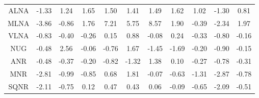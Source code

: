\documentclass[11pt,a4paper]{report}
\begin{document}
\begin{centering}
\begin{adjustwidth}{-2in}{-1in}
\begin{longtable}{ | c || c | c | c | c | c | c | c | c | c || c |}
ALNA &  \cellcolor[HTML]{FFDFDF} -1.33 &  \cellcolor[HTML]{DFDFFF} 1.24 &  \cellcolor[HTML]{D7D7FF} 1.65 &  \cellcolor[HTML]{D7D7FF} 1.50 &  \cellcolor[HTML]{DFDFFF} 1.41 &  \cellcolor[HTML]{D7D7FF} 1.49 &  \cellcolor[HTML]{D7D7FF} 1.62 &  \cellcolor[HTML]{E7E7FF} 1.02 &  \cellcolor[HTML]{FFDFDF} -1.30 &  \cellcolor[HTML]{E7E7FF} 0.81 \\
MLNA &  \cellcolor[HTML]{FF9F9F} -3.86 &  \cellcolor[HTML]{FFE7E7} -0.86 &  \cellcolor[HTML]{CFCFFF} 1.76 &  \cellcolor[HTML]{4848FF} 7.21 &  \cellcolor[HTML]{7070FF} 5.75 &  \cellcolor[HTML]{2828FF} 8.57 &  \cellcolor[HTML]{CFCFFF} 1.90 &  \cellcolor[HTML]{FFF7F7} -0.39 &  \cellcolor[HTML]{FFC7C7} -2.34 &  \cellcolor[HTML]{CFCFFF} 1.97 \\
VLNA &  \cellcolor[HTML]{FFE7E7} -0.83 &  \cellcolor[HTML]{FFF7F7} -0.40 &  \cellcolor[HTML]{FFF7F7} -0.26 &  \cellcolor[HTML]{FFFFFF} 0.15 &  \cellcolor[HTML]{E7E7FF} 0.88 &  \cellcolor[HTML]{FFFFFF} -0.08 &  \cellcolor[HTML]{F7F7FF} 0.24 &  \cellcolor[HTML]{FFF7F7} -0.33 &  \cellcolor[HTML]{FFE7E7} -0.80 &  \cellcolor[HTML]{FFF7F7} -0.16 \\
NUG &  \cellcolor[HTML]{FFEFEF} -0.48 &  \cellcolor[HTML]{BFBFFF} 2.56 &  \cellcolor[HTML]{FFFFFF} -0.06 &  \cellcolor[HTML]{FFEFEF} -0.76 &  \cellcolor[HTML]{D7D7FF} 1.67 &  \cellcolor[HTML]{FFD7D7} -1.45 &  \cellcolor[HTML]{FFD7D7} -1.69 &  \cellcolor[HTML]{FFF7F7} -0.20 &  \cellcolor[HTML]{FFE7E7} -0.90 &  \cellcolor[HTML]{FFFFFF} -0.15 \\
ANR &  \cellcolor[HTML]{FFEFEF} -0.48 &  \cellcolor[HTML]{FFF7F7} -0.37 &  \cellcolor[HTML]{FFF7F7} -0.20 &  \cellcolor[HTML]{FFE7E7} -0.82 &  \cellcolor[HTML]{FFDFDF} -1.32 &  \cellcolor[HTML]{DFDFFF} 1.38 &  \cellcolor[HTML]{FFFFFF} 0.10 &  \cellcolor[HTML]{FFF7F7} -0.27 &  \cellcolor[HTML]{FFEFEF} -0.78 &  \cellcolor[HTML]{FFF7F7} -0.31 \\
MNR &  \cellcolor[HTML]{FFB7B7} -2.81 &  \cellcolor[HTML]{FFE7E7} -0.99 &  \cellcolor[HTML]{FFE7E7} -0.85 &  \cellcolor[HTML]{EFEFFF} 0.68 &  \cellcolor[HTML]{CFCFFF} 1.81 &  \cellcolor[HTML]{FFFFFF} -0.07 &  \cellcolor[HTML]{FFEFEF} -0.63 &  \cellcolor[HTML]{FFDFDF} -1.31 &  \cellcolor[HTML]{FFB7B7} -2.87 &  \cellcolor[HTML]{FFEFEF} -0.78 \\
SQNR &  \cellcolor[HTML]{FFC7C7} -2.11 &  \cellcolor[HTML]{FFEFEF} -0.75 &  \cellcolor[HTML]{FFFFFF} 0.12 &  \cellcolor[HTML]{F7F7FF} 0.47 &  \cellcolor[HTML]{F7F7FF} 0.43 &  \cellcolor[HTML]{FFFFFF} 0.06 &  \cellcolor[HTML]{FFFFFF} -0.09 &  \cellcolor[HTML]{FFEFEF} -0.65 &  \cellcolor[HTML]{FFC7C7} -2.09 &  \cellcolor[HTML]{FFEFEF} -0.51 \\

\end{longtable}
\end{adjustwidth}
\end{centering}
\end{document}
